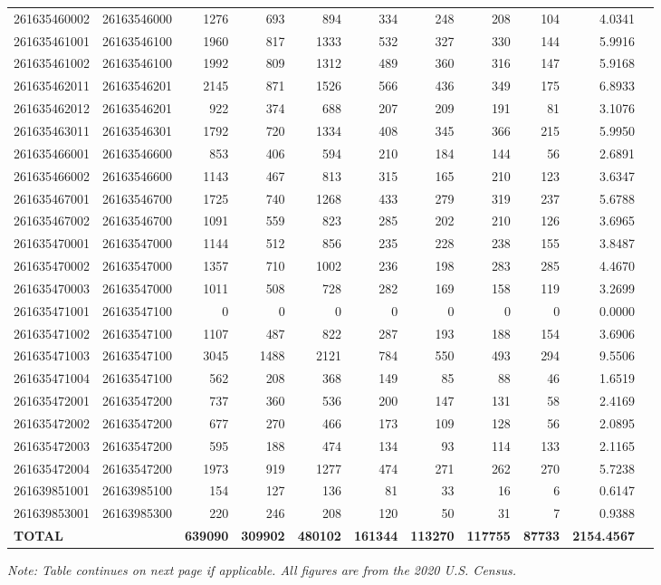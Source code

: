 \documentclass[11pt,landscape]{article}
\begin{document}
{\begin{longtable}[]{@{}lrrrrrrrrrr@{}}
261635460002 & 26163546000 & 1276 & 693 & 894 & 334 & 248 & 208 & 104 & 4.0341 \\
261635461001 & 26163546100 & 1960 & 817 & 1333 & 532 & 327 & 330 & 144 & 5.9916 \\
261635461002 & 26163546100 & 1992 & 809 & 1312 & 489 & 360 & 316 & 147 & 5.9168 \\
261635462011 & 26163546201 & 2145 & 871 & 1526 & 566 & 436 & 349 & 175 & 6.8933 \\
261635462012 & 26163546201 & 922 & 374 & 688 & 207 & 209 & 191 & 81 & 3.1076 \\
261635463011 & 26163546301 & 1792 & 720 & 1334 & 408 & 345 & 366 & 215 & 5.9950 \\
261635466001 & 26163546600 & 853 & 406 & 594 & 210 & 184 & 144 & 56 & 2.6891 \\
261635466002 & 26163546600 & 1143 & 467 & 813 & 315 & 165 & 210 & 123 & 3.6347 \\
261635467001 & 26163546700 & 1725 & 740 & 1268 & 433 & 279 & 319 & 237 & 5.6788 \\
261635467002 & 26163546700 & 1091 & 559 & 823 & 285 & 202 & 210 & 126 & 3.6965 \\
261635470001 & 26163547000 & 1144 & 512 & 856 & 235 & 228 & 238 & 155 & 3.8487 \\
261635470002 & 26163547000 & 1357 & 710 & 1002 & 236 & 198 & 283 & 285 & 4.4670 \\
261635470003 & 26163547000 & 1011 & 508 & 728 & 282 & 169 & 158 & 119 & 3.2699 \\
261635471001 & 26163547100 & 0 & 0 & 0 & 0 & 0 & 0 & 0 & 0.0000 \\
261635471002 & 26163547100 & 1107 & 487 & 822 & 287 & 193 & 188 & 154 & 3.6906 \\
261635471003 & 26163547100 & 3045 & 1488 & 2121 & 784 & 550 & 493 & 294 & 9.5506 \\
261635471004 & 26163547100 & 562 & 208 & 368 & 149 & 85 & 88 & 46 & 1.6519 \\
261635472001 & 26163547200 & 737 & 360 & 536 & 200 & 147 & 131 & 58 & 2.4169 \\
261635472002 & 26163547200 & 677 & 270 & 466 & 173 & 109 & 128 & 56 & 2.0895 \\
261635472003 & 26163547200 & 595 & 188 & 474 & 134 & 93 & 114 & 133 & 2.1165 \\
261635472004 & 26163547200 & 1973 & 919 & 1277 & 474 & 271 & 262 & 270 & 5.7238 \\
261639851001 & 26163985100 & 154 & 127 & 136 & 81 & 33 & 16 & 6 & 0.6147 \\
261639853001 & 26163985300 & 220 & 246 & 208 & 120 & 50 & 31 & 7 & 0.9388 \\
\midrule
\textbf{TOTAL} & \textbf{} & \textbf{639090} & \textbf{309902} & \textbf{480102} & \textbf{161344} & \textbf{113270} & \textbf{117755} & \textbf{87733} & \textbf{2154.4567} \\
\bottomrule
\end{longtable}
}

{\small \textit{Note: Table continues on next page if applicable. All figures are from the 2020 U.S. Census.}}
\end{document}
